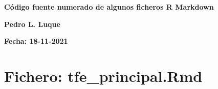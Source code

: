 \documentclass[11pt,a4paper,oneside,]{article}
\title{}
\author{}
\date{}
\def\ifdoblecara{} %
\let\ifdoblecara\undefined %
\newcommand{\bcenter}{\begin{center}}
\newcommand{\ecenter}{\end{center}}
\numberwithin{dummy}{section}
\theoremstyle{ocrenumbox}
\theoremstyle{blacknumex}
\theoremstyle{blacknumbox}
\theoremstyle{ocrenum}
\theoremstyle{ocrenum}
\begin{document}
\setlength{\parindent}{1em}

\pagestyle{fancy}
\ifdefined\ifdoblecara
\fancyhead[LE,RO]{}
\fancyhead[LO,RE]{}
\else
\fancyhead[RO]{}
\fancyhead[LO]{}
\fi
\renewcommand{\headrulewidth}{0pt}
\renewcommand{\footrulewidth}{0pt}


\large
\bcenter

\textbf{Código fuente numerado de algunos ficheros R Markdown}

\textbf{Pedro L. Luque}

\textbf{Fecha: 18-11-2021}

\ecenter

\normalsize

\setcounter{tocdepth}{4}
\tableofcontents

\tiny

\hypertarget{fichero-tfe_principal.rmd}{%
\section{Fichero: tfe\_principal.Rmd}\label{fichero-tfe_principal.rmd}}
\end{document}
